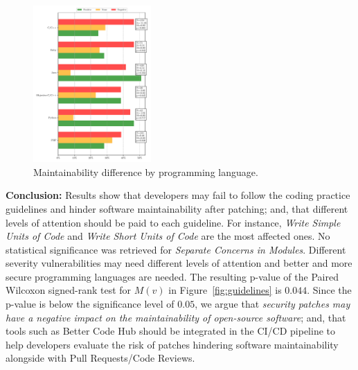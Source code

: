 \documentclass[10pt,conference]{IEEEtran}
\newcommand\Luis[1]{\nb{Luis}{mygreen}{#1}}
\begin{document}
\begin{figure}[h]
  \centering
  \includegraphics[width=0.4\textwidth]{figures/main_per_language.pdf}
  \caption{Maintainability difference by programming language.}
  \label{fig:lang_main}  
\end{figure}

\textbf{Conclusion:} Results show that developers may fail to follow the coding
practice guidelines and hinder software maintainability after patching; and, 
that different levels of attention should be paid to each guideline. For instance,
\emph{Write Simple Units of Code} and \emph{Write Short Units of Code}
are the most affected ones. No statistical significance was retrieved
for \emph{Separate Concerns in Modules}. Different severity vulnerabilities
may need different levels of attention and better and more secure programming languages
are needed.
The resulting p-value of the Paired Wilcoxon signed-rank test for $M(v)$ in Figure~\ref{fig:guidelines}
is $0.044$. Since the p-value is 
below the significance level of $0.05$, we argue that \emph{security patches 
may have a negative impact on the maintainability of open-source software}; and, 
that tools such as Better Code Hub should be integrated in the CI/CD pipeline
to help developers evaluate the risk of patches hindering software maintainability
alongside with Pull Requests/Code Reviews.

%
\end{document}
